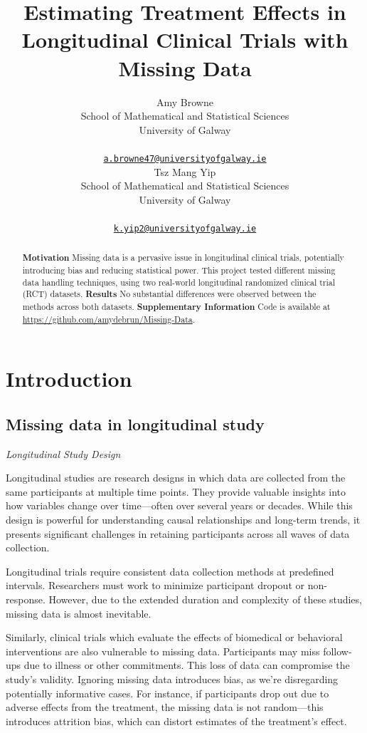 \documentclass{article}
\title{Estimating Treatment Effects in Longitudinal Clinical Trials with
Missing Data}
\author{
    Amy Browne
   \\
    School of Mathematical and Statistical Sciences \\
    University of Galway \\
   \\
  \texttt{\href{mailto:a.browne47@universityofgalway.ie}{\nolinkurl{a.browne47@universityofgalway.ie}}} \\
   \And
    Tsz Mang Yip
   \\
    School of Mathematical and Statistical Sciences \\
    University of Galway \\
   \\
  \texttt{\href{mailto:k.yip2@universityofgalway.ie}{\nolinkurl{k.yip2@universityofgalway.ie}}} \\
  }
\begin{document}
\maketitle


\begin{abstract}
\textbf{Motivation} Missing data is a pervasive issue in longitudinal
clinical trials, potentially introducing bias and reducing statistical
power. This project tested different missing data handling techniques,
using two real-world longitudinal randomized clinical trial (RCT)
datasets. \textbf{Results} No substantial differences were observed
between the methods across both datasets.
\textbf{Supplementary Information} Code is available at
\url{https://github.com/amydebrun/Missing-Data}.
\end{abstract}


\newpage

\section{Introduction}\label{introduction}

\subsection{Missing data in longitudinal
study}\label{missing-data-in-longitudinal-study}

\emph{Longitudinal Study Design}

Longitudinal studies are research designs in which data are collected
from the same participants at multiple time points. They provide
valuable insights into how variables change over time---often over
several years or decades. While this design is powerful for
understanding causal relationships and long-term trends, it presents
significant challenges in retaining participants across all waves of
data collection.

Longitudinal trials require consistent data collection methods at
predefined intervals. Researchers must work to minimize participant
dropout or non-response. However, due to the extended duration and
complexity of these studies, missing data is almost inevitable.

Similarly, clinical trials which evaluate the effects of biomedical or
behavioral interventions are also vulnerable to missing data.
Participants may miss follow-ups due to illness or other commitments.
This loss of data can compromise the study's validity. Ignoring missing
data introduces bias, as we're disregarding potentially informative
cases. For instance, if participants drop out due to adverse effects
from the treatment, the missing data is not random---this introduces
attrition bias, which can distort estimates of the treatment's effect.
\end{document}
